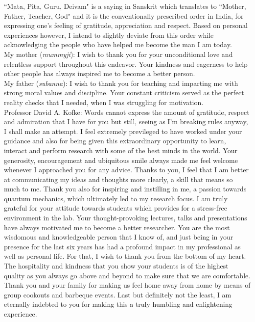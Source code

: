 ``Mata, Pita, Guru, Deivam" is a saying in Sanskrit which translates to ``Mother, Father, Teacher, God" and it is the conventionally prescribed order in India, for expressing one's feeling of gratitude, appreciation and respect. Based on personal experiences however, I intend to slightly deviate from this order while acknowledging the people who have helped me become the man I am today.\\

\noindent My mother (\emph{mummyji}): I wish to thank you for your unconditional love and relentless support throughout this endeavor. Your kindness and eagerness to help other people has always inspired me to become a better person.\\

\noindent My father (\emph{subanna}): I wish to thank you for teaching and imparting me with strong moral values and discipline. Your constant criticism served as the perfect reality checks that I needed, when I was struggling for motivation.\\

\noindent Professor David A. Kofke: Words cannot express the amount of gratitude, respect and admiration that I have for you but still, seeing as I'm breaking rules anyway, I shall make an attempt. I feel extremely previleged to have worked under your guidance and also for being given this extraordinary opportunity to learn, interact and perform research with some of the best minds in the world. Your generosity, encouragement and ubiquitous smile always made me feel welcome whenever I approached you for any advice. Thanks to you, I feel that I am better at communicating my ideas and thoughts more clearly, a skill that means so much to me. Thank you also for inspiring and instilling in me, a passion towards quantum mechanics, which ultimately led to my research focus. I am truly grateful for your attitude towards students which provides for a stress-free environment in the lab. Your thought-provoking lectures, talks and presentations have always motivated me to become a better researcher. You are the most wisdomous and knowledgeable person that I know of, and just being in your presence for the last six years has had a profound impact in my professional as well as personal life. For that, I wish to thank you from the bottom of my heart. The hospitality and kindness that you show your students is of the highest quality as you always go above and beyond to make sure that we are comfortable. Thank you and your family for making us feel home away from home by means of group cookouts and barbeque events. Last but definitely not the least, I am eternally indebted to you for making this a truly humbling and enlightening experience.\\

